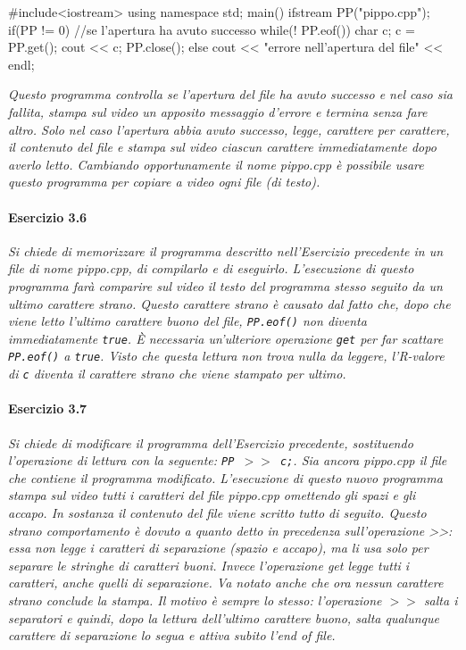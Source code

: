 \documentclass[a4paper,12pt]{book}
\begin{document}
\begin{codice}

#include<iostream>
using namespace std;
main() {
  ifstream PP("pippo.cpp");
  if(PP != 0) {  //se l'apertura ha avuto successo
    while(! PP.eof()) {
      char c;
      c = PP.get();
      cout << c;
    }
    PP.close();
  }
  else
    cout << "errore nell'apertura del file" << endl;
}
\end{codice}

\noindent \textit{Questo programma controlla se l'apertura del file ha avuto successo e nel caso sia fallita, stampa sul video un apposito messaggio d'errore e termina senza fare altro.
Solo nel caso l'apertura abbia avuto successo, legge, carattere per carattere, il contenuto del file e stampa sul video ciascun carattere immediatamente dopo averlo letto.
Cambiando opportunamente il nome pippo.cpp è possibile usare questo programma per copiare a video ogni file (di testo).}

\paragraph{Esercizio 3.6}
\textit{Si chiede di memorizzare il programma descritto nell'Esercizio precedente in un file di nome pippo.cpp, di compilarlo e di eseguirlo.
L'esecuzione di questo programma farà comparire sul video il testo del programma stesso seguito da un ultimo carattere strano.
Questo carattere strano è causato dal fatto che, dopo che viene letto l'ultimo carattere buono del file, \texttt{PP.eof()} non diventa immediatamente \texttt{true}.
È necessaria un'ulteriore operazione \texttt{get} per far scattare \texttt{PP.eof()} a \texttt{true}.
Visto che questa lettura non trova nulla da leggere, l'R-valore di \texttt{c} diventa il carattere strano che viene stampato per ultimo.}

\paragraph{Esercizio 3.7}
\textit{Si chiede di modificare il programma dell'Esercizio precedente, sostituendo l'operazione di lettura con la seguente: \texttt{PP $>>$ c;}.
Sia ancora pip­po.cpp il file che contiene il programma modificato.
L'esecuzione di questo nuovo programma stampa sul video tutti i caratteri del file pippo.cpp omettendo gli spazi e gli accapo.
In sostanza il contenuto del file viene scritto tutto di seguito.
Questo strano comportamento è dovuto a quanto detto in precedenza sull'operazione >>: essa non legge i caratteri di separazione (spazio e accapo), ma li usa solo per separare le stringhe di caratteri buoni.
Invece l'operazione get legge tutti i caratteri, anche quelli di separazione.
Va notato anche che ora nessun carattere strano conclude la stampa.
Il motivo è sempre lo stesso: l'operazione $>>$ salta i separatori e quindi, dopo la lettura dell'ultimo carattere buono, salta qualunque carattere di separazione lo segua e attiva subito l'end of file.}
\end{document}
